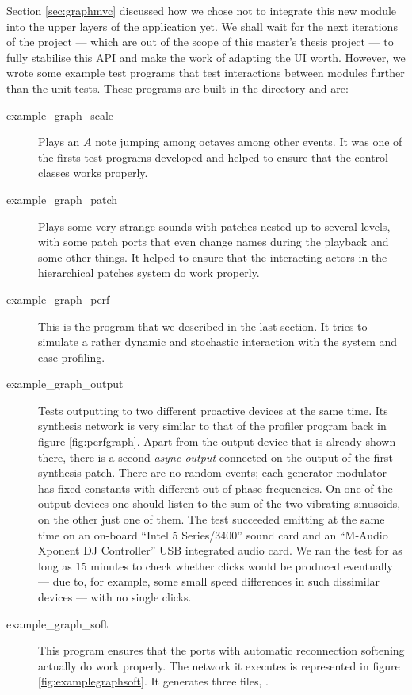 Section \ref{sec:graphmvc} discussed how we chose not to integrate
this new module into the upper layers of the application yet. We shall
wait for the next iterations of the project --- which are out of the
scope of this master's thesis project --- to fully stabilise this API
and make the work of adapting the UI worth. However, we wrote some
example test programs that test interactions between modules further
than the unit tests. These programs are built in the 
directory and are:
\begin{description}
\item[example\_graph\_scale] Plays an $A$ note jumping among octaves
  among other events. It was one of the firsts test programs developed
  and helped to ensure that the control classes works properly.

\item[example\_graph\_patch] Plays some very strange sounds with
  patches nested up to several levels, with some patch ports that even
  change names during the playback and some other things. It helped to
  ensure that the interacting actors in the hierarchical patches
  system do work properly.

\item[example\_graph\_perf] This is the program that we described in
  the last section. It tries to simulate a rather dynamic and
  stochastic interaction with the system and ease profiling.

\item[example\_graph\_output] Tests outputting to two different
  proactive devices at the same time. Its synthesis network is very
  similar to that of the profiler program back in figure
  \ref{fig:perfgraph}. Apart from the output device that is already
  shown there, there is a second \emph{async output} connected on the
  output of the first synthesis patch. There are no random events;
  each generator-modulator has fixed constants with different out of
  phase frequencies. On one of the output devices one should listen to
  the sum of the two vibrating sinusoids, on the other just one of
  them. The test succeeded emitting at the same time on an on-board
  ``Intel 5 Series/3400'' sound card and an ``M-Audio Xponent DJ
  Controller'' USB integrated audio card. We ran the test for as long
  as 15 minutes to check whether clicks would be produced eventually
  --- due to, for example, some small speed differences in such
  dissimilar devices --- with no single clicks.

\item[example\_graph\_soft] This program ensures that the ports with
  automatic reconnection softening actually do work properly. The
  network it executes is represented in figure
  \ref{fig:examplegraphsoft}. It generates three files,
  . 


\end{description}
